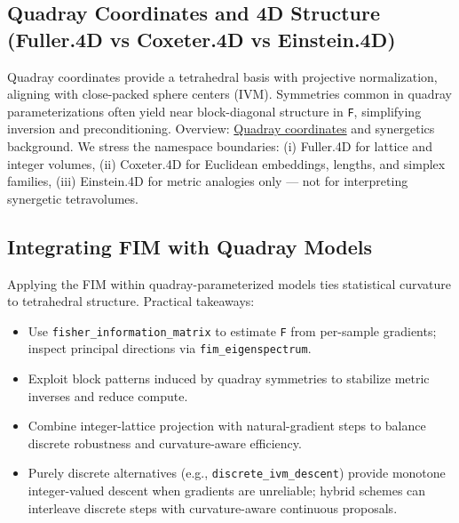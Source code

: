 \documentclass[
  10pt,
]{article}
\providecommand{\tightlist}{%
  \setlength{\itemsep}{0pt}\setlength{\parskip}{0pt}}
\begin{document}
\hypertarget{quadray-coordinates-and-4d-structure-fuller.4d-vs-coxeter.4d-vs-einstein.4d}{%
\subsection{Quadray Coordinates and 4D Structure (Fuller.4D vs
Coxeter.4D vs
Einstein.4D)}\label{quadray-coordinates-and-4d-structure-fuller.4d-vs-coxeter.4d-vs-einstein.4d}}

Quadray coordinates provide a tetrahedral basis with projective
normalization, aligning with close-packed sphere centers (IVM).
Symmetries common in quadray parameterizations often yield near
block-diagonal structure in \texttt{F}, simplifying inversion and
preconditioning. Overview:
\href{https://en.wikipedia.org/wiki/Quadray_coordinates}{Quadray
coordinates} and synergetics background. We stress the namespace
boundaries: (i) Fuller.4D for lattice and integer volumes, (ii)
Coxeter.4D for Euclidean embeddings, lengths, and simplex families,
(iii) Einstein.4D for metric analogies only --- not for interpreting
synergetic tetravolumes.

\hypertarget{integrating-fim-with-quadray-models}{%
\subsection{Integrating FIM with Quadray
Models}\label{integrating-fim-with-quadray-models}}

Applying the FIM within quadray-parameterized models ties statistical
curvature to tetrahedral structure. Practical takeaways:

\begin{itemize}
\tightlist
\item
  Use \texttt{fisher\_information\_matrix} to estimate \texttt{F} from
  per-sample gradients; inspect principal directions via
  \texttt{fim\_eigenspectrum}.
\item
  Exploit block patterns induced by quadray symmetries to stabilize
  metric inverses and reduce compute.
\item
  Combine integer-lattice projection with natural-gradient steps to
  balance discrete robustness and curvature-aware efficiency.
\item
  Purely discrete alternatives (e.g., \texttt{discrete\_ivm\_descent})
  provide monotone integer-valued descent when gradients are unreliable;
  hybrid schemes can interleave discrete steps with curvature-aware
  continuous proposals.
\end{itemize}
\end{document}

